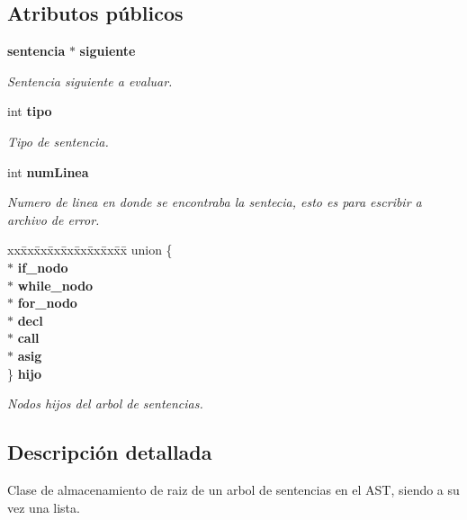 \subsection*{Atributos p\'{u}blicos}
\begin{CompactItemize}
\item 
{\bf sentencia} $\ast$ {\bf siguiente}
\begin{CompactList}\small\item\em Sentencia siguiente a evaluar. \item\end{CompactList}\item 
int {\bf tipo}
\begin{CompactList}\small\item\em Tipo de sentencia. \item\end{CompactList}\item 
int {\bf num\-Linea}
\begin{CompactList}\small\item\em Numero de linea en donde se encontraba la sentecia, esto es para escribir a archivo de error. \item\end{CompactList}\item 
\begin{tabbing}
xx\=xx\=xx\=xx\=xx\=xx\=xx\=xx\=xx\=\kill
union \{\\
 $\ast$ {\bf if\_nodo}\\
 $\ast$ {\bf while\_nodo}\\
 $\ast$ {\bf for\_nodo}\\
 $\ast$ {\bf decl}\\
 $\ast$ {\bf call}\\
 $\ast$ {\bf asig}\\
\} {\bf hijo}\\

\end{tabbing}\begin{CompactList}\small\item\em Nodos hijos del arbol de sentencias. \item\end{CompactList}\end{CompactItemize}


\subsection{Descripci\'{o}n detallada}
Clase de almacenamiento de raiz de un arbol de sentencias en el AST, siendo a su vez una lista. 



